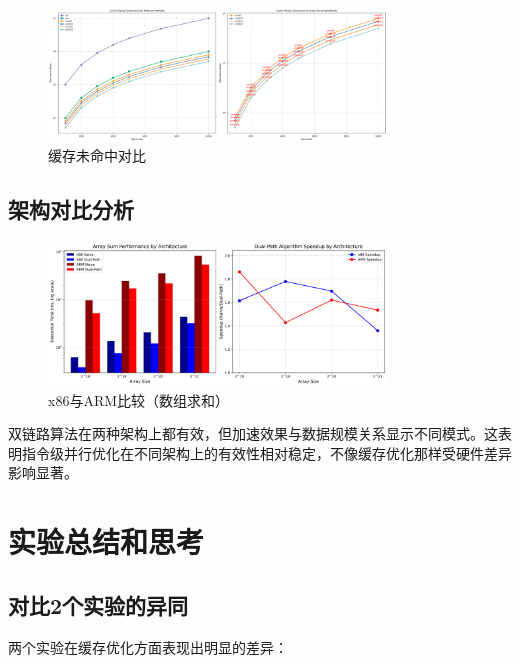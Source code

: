 \documentclass[a4paper,colorlinks=true,linkcolor=blue,urlcolor=blue,citecolor=green,bookmarks=true]{article}
\begin{document}
\begin{figure}[htbp]
  \centering
  \includegraphics[width=0.8\textwidth]{cache_misses_comparison.png}
  \caption{缓存未命中对比}
  \label{fig:cache_misses_comparison}
\end{figure}

\subsection{架构对比分析}

\begin{figure}[htbp]
  \centering
  \includegraphics[width=0.8\textwidth]{array_sum_arch_comparison.png}
  \caption{x86与ARM比较（数组求和）}
  \label{fig:array_sum_arch_comparison}
\end{figure}

双链路算法在两种架构上都有效，但加速效果与数据规模关系显示不同模式。这表明指令级并行优化在不同架构上的有效性相对稳定，不像缓存优化那样受硬件差异影响显著。

\section{实验总结和思考}

\subsection{对比2个实验的异同}

两个实验在缓存优化方面表现出明显的差异：
\end{document}
